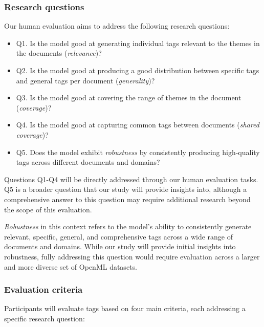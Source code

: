 \subsubsection{Research questions}
Our human evaluation aims to address the following research questions:

\begin{itemize}
\item Q1. Is the model good at generating individual tags relevant to the themes in the documents (\textit{relevance})?
\item Q2. Is the model good at producing a good distribution between specific tags and general tags per document (\textit{generality})?
\item Q3. Is the model good at covering the range of themes in the document (\textit{coverage})?
\item Q4. Is the model good at capturing common tags between documents (\textit{shared coverage})?
\item Q5. Does the model exhibit \textit{robustness} by consistently producing high-quality tags across different documents and domains?
\end{itemize}

Questions Q1-Q4 will be directly addressed through our human evaluation tasks. Q5 is a broader question that our study will provide insights into, although a comprehensive answer to this question may require additional research beyond the scope of this evaluation.

\textit{Robustness} in this context refers to the model's ability to consistently generate relevant, specific, general, and comprehensive tags across a wide range of documents and domains. While our study will provide initial insights into robustness, fully addressing this question would require evaluation across a larger and more diverse set of OpenML datasets.

\subsubsection{Evaluation criteria}
Participants will evaluate tags based on four main criteria, each addressing a specific research question:

